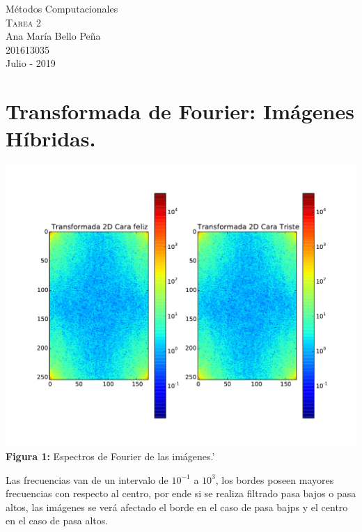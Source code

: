 \documentclass[11pt,letterpaper]{exam}
\begin{document}
\begin{center}
{\Large Métodos Computacionales} \\
\textsc{Tarea 2}\\
{\large Ana María Bello Peña}\\
201613035\\
Julio - 2019\\
\end{center}

\noindent
\section{Transformada de Fourier: Im\'agenes H\'ibridas.}
\begin{center}
\includegraphics[width=16.cm]{FFtIm.pdf}
\textbf{Figura 1:}{ Espectros de Fourier de las im\'agenes.'}
\end{center}

{Las frecuencias van de un intervalo de $10^{-1}$ a $10^{3}$, los bordes poseen mayores frecuencias con respecto al centro, por ende si se realiza filtrado pasa bajos o pasa altos, las im\'agenes se ver\'a afectado el borde en el caso de pasa bajps y el centro en el caso de pasa altos.}
\end{document}
